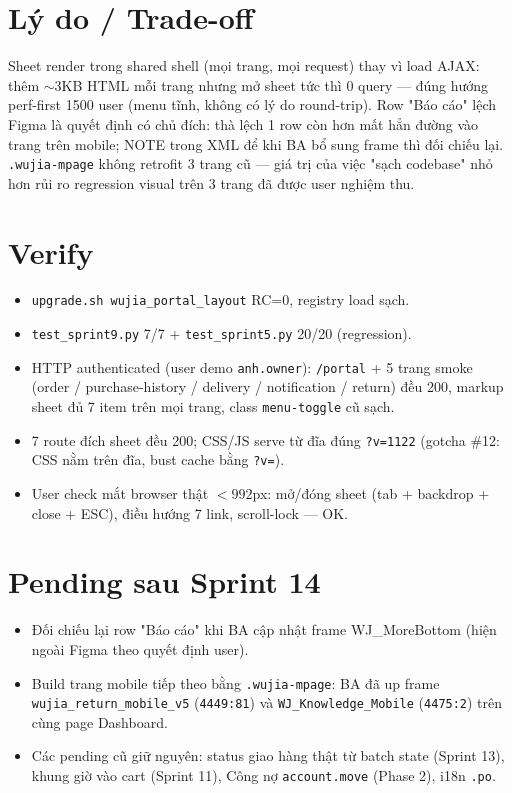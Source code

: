 \section{Lý do / Trade-off}

Sheet render trong shared shell (mọi trang, mọi request) thay vì load AJAX: thêm
\(\sim\)3KB HTML mỗi trang nhưng mở sheet tức thì 0 query --- đúng hướng perf-first
1500 user (menu tĩnh, không có lý do round-trip). Row "Báo cáo" lệch Figma là quyết
định có chủ đích: thà lệch 1 row còn hơn mất hẳn đường vào trang trên mobile; NOTE
trong XML để khi BA bổ sung frame thì đối chiếu lại. \texttt{.wujia-mpage} không
retrofit 3 trang cũ --- giá trị của việc "sạch codebase" nhỏ hơn rủi ro regression
visual trên 3 trang đã được user nghiệm thu.

\section{Verify}

\begin{itemize}
  \item \texttt{upgrade.sh wujia\_portal\_layout} RC=0, registry load sạch.
  \item \texttt{test\_sprint9.py} 7/7 + \texttt{test\_sprint5.py} 20/20 (regression).
  \item HTTP authenticated (user demo \texttt{anh.owner}): \texttt{/portal} + 5 trang
        smoke (order / purchase-history / delivery / notification / return) đều 200,
        markup sheet đủ 7 item trên mọi trang, class \texttt{menu-toggle} cũ sạch.
  \item 7 route đích sheet đều 200; CSS/JS serve từ đĩa đúng \texttt{?v=1122}
        (gotcha \#12: CSS nằm trên đĩa, bust cache bằng \texttt{?v=}).
  \item User check mắt browser thật \(<992\)px: mở/đóng sheet (tab + backdrop +
        close + ESC), điều hướng 7 link, scroll-lock --- OK.
\end{itemize}

\section{Pending sau Sprint 14}

\begin{itemize}
  \item Đối chiếu lại row "Báo cáo" khi BA cập nhật frame WJ\_MoreBottom (hiện ngoài
        Figma theo quyết định user).
  \item Build trang mobile tiếp theo bằng \texttt{.wujia-mpage}: BA đã up frame
        \texttt{wujia\_return\_mobile\_v5} (\texttt{4449:81}) và
        \texttt{WJ\_Knowledge\_Mobile} (\texttt{4475:2}) trên cùng page Dashboard.
  \item Các pending cũ giữ nguyên: status giao hàng thật từ batch state (Sprint 13),
        khung giờ vào cart (Sprint 11), Công nợ \texttt{account.move} (Phase 2),
        i18n \texttt{.po}.
\end{itemize}
